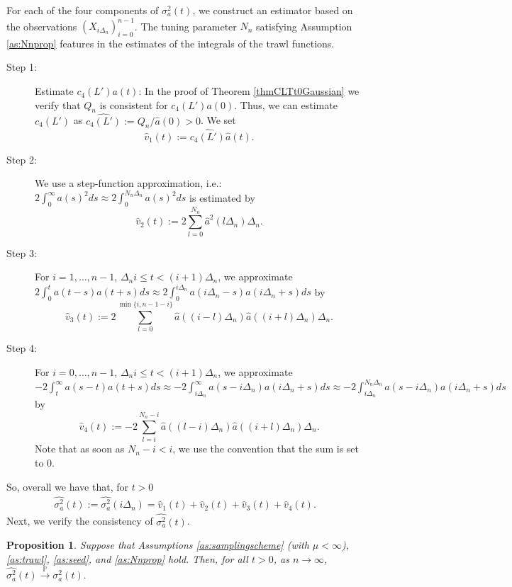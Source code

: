 \documentclass{article}
\theoremstyle{plain}
\newtheorem{proposition}{Proposition}
\theoremstyle{definition}
\theoremstyle{remark}
\begin{document}
For each of the four components of $\sigma_{a}^{2}(t)$, we construct an estimator  based on the observations
$(X_{i\Delta_{n}})_{i=0}^{n-1}$. The tuning parameter $N_n$ satisfying Assumption \ref{as:Nnprop} features in the estimates of the integrals of the trawl functions.
\begin{description}
	
	\item [{Step 1:}] Estimate $c_{4}(L')a(t)$: In  the proof
	of Theorem \ref{thmCLTt0Gaussian} we verify that
	$Q_{n}$ is consistent for $c_{4}(L')a(0)$. Thus, we can estimate $c_{4}(L')$ as 
	$\widehat{c_{4}(L')}:=Q_{n}/\hat{a}(0)>0$.
	We set 
	\[
	\hat{v}_{1}(t):=\widehat{c_{4}(L')}\hat{a}(t).
	\]
	
		
	\item [{Step 2:}] 
	We use a step-function approximation, i.e.: $2\int_{0}^{\infty}a(s)^{2}ds\approx2\int_{0}^{N_{n}\Delta_{n}}a(s)^{2}ds$
	is estimated by 
	\[
	\hat{v}_{2}(t):=2\sum_{l=0}^{N_{n}}\hat{a}^{2}(l\Delta_{n})\Delta_{n}.
	\]
	
	\item [{Step 3:}] For $i=1,\ldots,n-1$, $\Delta_{n}i\leq t<(i+1)\Delta_{n}$,
	we approximate $2\int_{0}^{t}a(t-s)a(t+s)ds\approx2\int_{0}^{i\Delta_{n}}a(i\Delta_{n}-s)a(i\Delta_{n}+s)ds$
	by 
	\[
	\hat{v}_{3}(t):=2\sum_{l=0}^{\min\{i,n-1-i\}}\hat{a}((i-l)\Delta_{n})\hat{a}((i+l)\Delta_{n})\Delta_{n}.
	\]
	\item [{Step 4:}] For $i=0,\ldots,n-1$,	  $\Delta_{n}i\leq t<(i+1)\Delta_{n}$,
	we approximate $-2\int_{t}^{\infty}a(s-t)a(t+s)ds\approx-2\int_{i\Delta_{n}}^{\infty}a(s-i\Delta_{n})a(i\Delta_{n}+s)ds\approx-2\int_{i\Delta_{n}}^{N_{n}\Delta_{n}}a(s-i\Delta_{n})a(i\Delta_{n}+s)ds$
	by 
	\[
	\hat{v}_{4}(t):=-2\sum_{l=i}^{N_{n}-i}\hat{a}((l-i)\Delta_{n})\hat{a}((i+l)\Delta_{n})\Delta_{n}.
	\]
	Note that as soon as $N_{n}-i<i$, we use the convention that the sum
	is set to 0. 
\end{description}
So, overall we have that, for $t>0$
\begin{align}
	\widehat{\sigma_{a}^{2}}(t):=\widehat{\sigma_{a}^{2}}(i\Delta_{n})=\hat{v}_{1}(t)+\hat{v}_{2}(t)+\hat{v}_{3}(t)+\hat{v}_{4}(t).
	\label{eq:sigma2a-est}
\end{align}
Next, we verify the consistency of $\widehat{\sigma_{a}^{2}}(t)$.
\begin{proposition}\label{AVARconv} Suppose that Assumptions \ref{as:samplingscheme} (with $\mu<\infty$),
	\ref{as:trawl}, \ref{as:seed}, and \ref{as:Nnprop} hold. Then, for all $t>0$, as $n\rightarrow\infty$, $	\widehat{\sigma_{a}^{2}}(t)\overset{\mathbb{P}}{\rightarrow}\sigma_{a}^{2}(t).$
\end{proposition}
\end{document}
